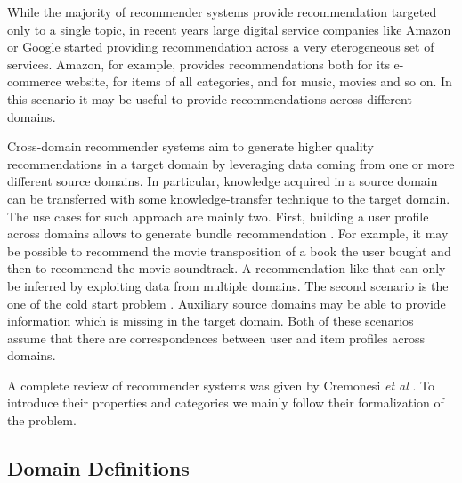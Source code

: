 While the majority of recommender systems provide recommendation targeted only to a single topic, in recent years large digital service companies like Amazon or Google started providing recommendation across a very eterogeneous set of services. Amazon, for example, provides recommendations both for its e-commerce website, for items of all categories, and for music, movies and so on. In this scenario it may be useful to provide recommendations across different domains.\par
Cross-domain recommender systems aim to generate higher quality recommendations in a target domain by leveraging data coming from one or more different source domains. In particular, knowledge acquired in a source domain can be transferred with some knowledge-transfer technique to the target domain.\\
The use cases for such approach are mainly two. First, building a user profile across domains allows to generate bundle recommendation \cite{10.1007/s11257-012-9131-2, 10.1007/s11257-007-9042-9, 10.1007/s11257-012-9128-x}. For example, it may be possible to recommend the movie transposition of a book the user bought and then to recommend the movie soundtrack. A recommendation like that can only be inferred by exploiting data from multiple domains. The second scenario is the one of the cold start problem \cite{10.1145/2645710.2645777, 10.1007/978-3-642-22362-4_26, 10.1145/2507157.2507206}. Auxiliary source domains may be able to provide information which is missing in the target domain. Both of these scenarios assume that there are correspondences between user and item profiles across domains.\par
A complete review of recommender systems was given by Cremonesi \textit{et al} \cite{10.1007/978-1-4899-7637-6_27}. To introduce their properties and categories we mainly follow their formalization of the problem.


\subsection{Domain Definitions}

